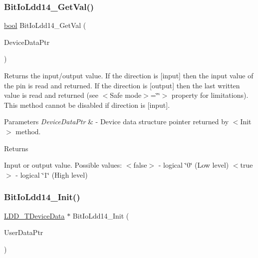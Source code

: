 \subsubsection{\texorpdfstring{Bit\+Io\+Ldd14\+\_\+\+Get\+Val()}{BitIoLdd14\_GetVal()}}
{\footnotesize\ttfamily \hyperlink{group___p_e___types__module_ga97a80ca1602ebf2303258971a2c938e2}{bool} Bit\+Io\+Ldd14\+\_\+\+Get\+Val (\begin{DoxyParamCaption}\item[{\hyperlink{group___p_e___types__module_gac5cf1362f1f0e3a2ce71b1bf2276d091}{L\+D\+D\+\_\+\+T\+Device\+Data} $\ast$}]{Device\+Data\+Ptr }\end{DoxyParamCaption})}



Returns the input/output value. If the direction is \mbox{[}input\mbox{]} then the input value of the pin is read and returned. If the direction is \mbox{[}output\mbox{]} then the last written value is read and returned (see $<$\+Safe mode$>$=\char`\"{}\char`\"{}$>$ property for limitations). This method cannot be disabled if direction is \mbox{[}input\mbox{]}. 


\begin{DoxyParams}{Parameters}
{\em Device\+Data\+Ptr} & -\/ Device data structure pointer returned by $<$\+Init$>$ method. \\
\hline
\end{DoxyParams}
\begin{DoxyReturn}{Returns}

\begin{DoxyItemize}
\item Input or output value. Possible values\+: $<$false$>$ -\/ logical \char`\"{}0\char`\"{} (Low level) $<$true$>$ -\/ logical \char`\"{}1\char`\"{} (High level) 
\end{DoxyItemize}
\end{DoxyReturn}
\mbox{\label{group___bit_io_ldd14__module_ga4f0f63657193f71b93f7ccc9aa4f5a86}} 
\subsubsection{\texorpdfstring{Bit\+Io\+Ldd14\+\_\+\+Init()}{BitIoLdd14\_Init()}}
{\footnotesize\ttfamily \hyperlink{group___p_e___types__module_gac5cf1362f1f0e3a2ce71b1bf2276d091}{L\+D\+D\+\_\+\+T\+Device\+Data} $\ast$ Bit\+Io\+Ldd14\+\_\+\+Init (\begin{DoxyParamCaption}\item[{\hyperlink{group___p_e___types__module_ga0b66a73f87238a782318aa0be7578e35}{L\+D\+D\+\_\+\+T\+User\+Data} $\ast$}]{User\+Data\+Ptr }\end{DoxyParamCaption})}



